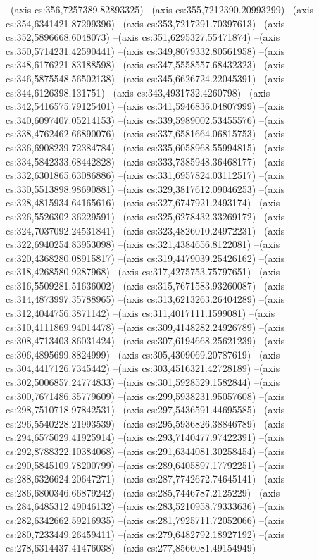 --(axis cs:356,7257389.82893325)
--(axis cs:355,7212390.20993299)
--(axis cs:354,6341421.87299396)
--(axis cs:353,7217291.70397613)
--(axis cs:352,5896668.6048073)
--(axis cs:351,6295327.55471874)
--(axis cs:350,5714231.42590441)
--(axis cs:349,8079332.80561958)
--(axis cs:348,6176221.83188598)
--(axis cs:347,5558557.68432323)
--(axis cs:346,5875548.56502138)
--(axis cs:345,6626724.22045391)
--(axis cs:344,6126398.131751)
--(axis cs:343,4931732.4260798)
--(axis cs:342,5416575.79125401)
--(axis cs:341,5946836.04807999)
--(axis cs:340,6097407.05214153)
--(axis cs:339,5989002.53455576)
--(axis cs:338,4762462.66890076)
--(axis cs:337,6581664.06815753)
--(axis cs:336,6908239.72384784)
--(axis cs:335,6058968.55994815)
--(axis cs:334,5842333.68442828)
--(axis cs:333,7385948.36468177)
--(axis cs:332,6301865.63086886)
--(axis cs:331,6957824.03112517)
--(axis cs:330,5513898.98690881)
--(axis cs:329,3817612.09046253)
--(axis cs:328,4815934.64165616)
--(axis cs:327,6747921.2493174)
--(axis cs:326,5526302.36229591)
--(axis cs:325,6278432.33269172)
--(axis cs:324,7037092.24531841)
--(axis cs:323,4826010.24972231)
--(axis cs:322,6940254.83953098)
--(axis cs:321,4384656.8122081)
--(axis cs:320,4368280.08915817)
--(axis cs:319,4479039.25426162)
--(axis cs:318,4268580.9287968)
--(axis cs:317,4275753.75797651)
--(axis cs:316,5509281.51636002)
--(axis cs:315,7671583.93260087)
--(axis cs:314,4873997.35788965)
--(axis cs:313,6213263.26404289)
--(axis cs:312,4044756.3871142)
--(axis cs:311,4017111.1599081)
--(axis cs:310,4111869.94014478)
--(axis cs:309,4148282.24926789)
--(axis cs:308,4713403.86031424)
--(axis cs:307,6194668.25621239)
--(axis cs:306,4895699.8824999)
--(axis cs:305,4309069.20787619)
--(axis cs:304,4417126.7345442)
--(axis cs:303,4516321.42728189)
--(axis cs:302,5006857.24774833)
--(axis cs:301,5928529.1582844)
--(axis cs:300,7671486.35779609)
--(axis cs:299,5938231.95057608)
--(axis cs:298,7510718.97842531)
--(axis cs:297,5436591.44695585)
--(axis cs:296,5540228.21993539)
--(axis cs:295,5936826.38846789)
--(axis cs:294,6575029.41925914)
--(axis cs:293,7140477.97422391)
--(axis cs:292,8788322.10384068)
--(axis cs:291,6344081.30258454)
--(axis cs:290,5845109.78200799)
--(axis cs:289,6405897.17792251)
--(axis cs:288,6326624.20647271)
--(axis cs:287,7742672.74645141)
--(axis cs:286,6800346.66879242)
--(axis cs:285,7446787.2125229)
--(axis cs:284,6485312.49046132)
--(axis cs:283,5210958.79333636)
--(axis cs:282,6342662.59216935)
--(axis cs:281,7925711.72052066)
--(axis cs:280,7233449.26459411)
--(axis cs:279,6482792.18927192)
--(axis cs:278,6314437.41476038)
--(axis cs:277,8566081.49154949)
